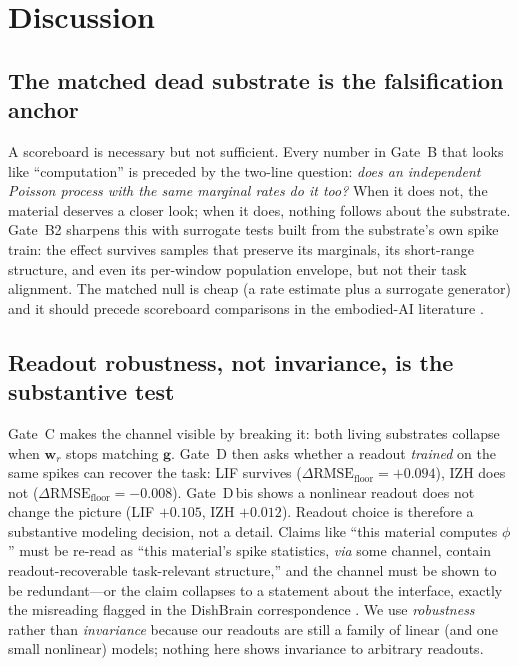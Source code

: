 \documentclass[10pt,a4paper]{article}
\newcommand{\RMSE}{\ensuremath{\mathrm{RMSE}}}
\newcommand{\dfloor}{\ensuremath{\Delta\RMSE_{\mathrm{floor}}}}
\begin{document}
\section{Discussion}\label{sec:discussion}

\subsection{The matched dead substrate is the falsification
anchor}\label{sec:disc1}

A scoreboard is necessary but not sufficient. Every number in
Gate~B that looks like ``computation'' is preceded by the two-line
question: \emph{does an independent Poisson process with the same
marginal rates do it too?} When it does not, the material deserves a
closer look; when it does, nothing follows about the substrate. Gate~B2
sharpens this with surrogate tests built from the substrate's own spike
train: the effect survives samples that preserve its marginals, its
short-range structure, and even its per-window population envelope, but
not their task alignment. The matched null is cheap (a rate estimate
plus a surrogate generator) and it should precede scoreboard
comparisons in the embodied-AI literature
\cite{kagan2022dishbrain,balci2023neurons,lukosevicius2009,
wringe2025rc}.

\subsection{Readout robustness, not invariance, is the substantive test}\label{sec:disc2}

Gate~C makes the channel visible by breaking it: both living
substrates collapse when $\mathbf{w}_r$ stops matching $\mathbf{g}$.
Gate~D then asks whether a readout \emph{trained} on the same spikes
can recover the task: LIF survives ($\dfloor=+0.094$), IZH does not
($\dfloor=-0.008$). Gate~D\,bis shows a nonlinear readout does not
change the picture (LIF $+0.105$, IZH $+0.012$). Readout choice is
therefore a substantive modeling decision, not a detail. Claims like
``this material computes $\phi$'' must be re-read as ``this material's
spike statistics, \emph{via} some channel, contain readout-recoverable
task-relevant structure,'' and the channel must be shown to be
redundant---or the claim collapses to a statement about the interface,
exactly the misreading flagged in the DishBrain correspondence
\cite{balci2023neurons}. We use \emph{robustness} rather than
\emph{invariance} because our readouts are still a family of linear (and
one small nonlinear) models; nothing here shows invariance to arbitrary
readouts.
\end{document}
